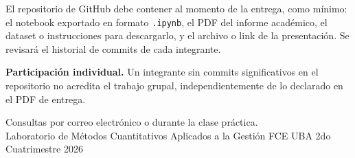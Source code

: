 \documentclass[11pt,a4paper]{article}
\newcommand{\Cuatrimestre}{2do Cuatrimestre 2026}
\begin{document}
El repositorio de GitHub debe contener al momento de la entrega, como mínimo: el notebook
exportado en formato \texttt{.ipynb}, el PDF del informe académico, el dataset o instrucciones para
descargarlo, y el archivo o link de la presentación. Se revisará el historial de commits de
cada integrante.

\begin{nota}
\textbf{Participación individual.} Un integrante sin commits significativos en el repositorio no
acredita el trabajo grupal, independientemente de lo declarado en el PDF de entrega.
\end{nota}

\vfill
\begin{center}\small\color{gray}
Consultas por correo electrónico o durante la clase práctica.\\
Laboratorio de Métodos Cuantitativos Aplicados a la Gestión \textperiodcentered{} FCE UBA \textperiodcentered{} \Cuatrimestre
\end{center}
\end{document}
